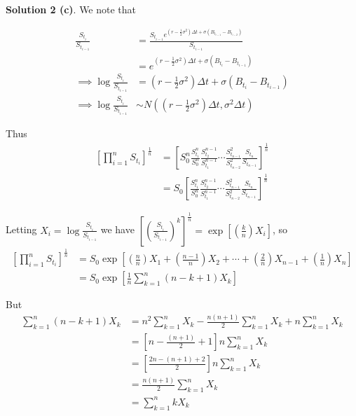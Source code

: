 \documentclass[12pt]{article}
\begin{document}
{\bf Solution 2 (c)}. We note that

\begin{align*}
	\frac{S_{t_i}}{S_{t_{i - 1}}} &= \frac{S_{t_{i - 1}} e^{ (r - \frac{1}{2}\sigma^2)\Delta t + \sigma (B_{t_{i - 1}} - B_{t_{i - 2}}) } }{ S_{t_{i - 1}} } \\
	&= e^{ (r - \frac{1}{2}\sigma^2) \Delta t +  \sigma (B_{t_i} - B_{t_{i - 1}}) } \\
	\implies \log \frac{S_{t_i}}{S_{t_{i - 1}}} &= \left(r - \frac{1}{2}\sigma^2\right)\Delta t + \sigma \left( B_{t_i}  - B_{t_{i - 1}} \right) \\
	\implies \log \frac{S_{t_i}}{S_{t_{i - 1}}} &\sim N\left( \left(r - \frac{1}{2}\sigma^2\right)\Delta t, \sigma^2\Delta t \right)
\end{align*}

Thus
\begin{align*}
\left[ \prod^n_{i=1} S_{t_i} \right]^{\frac{1}{n}} &= \left[S_0^{n} \frac{S_{t_1}^n}{S_0^n} \frac{S_{t_2}^{n - 1}}{S_{t_1}^{n - 1}} \cdots \frac{S_{t_{n - 1}}^{2}}{S_{t_{n - 2}}^2} \frac{S_{t_n}}{S_{t_{n - 1}}} \right]^\frac{1}{n} \\
	&= S_0 \left[ \frac{S_{t_1}^n}{S_0^n} \frac{S_{t_2}^{n - 1}}{S_{t_1}^{n - 1}} \cdots \frac{S_{t_{n - 1}}^{2}}{S_{t_{n - 2}}^2} \frac{S_{t_n}}{S_{t_{n - 1}}} \right]^\frac{1}{n}
\end{align*}

Letting $ X_i = \log \frac{S_{t_i}}{S_{t_{i - 1}}}$ we have $\left[ \left( \frac{S_{t_i}}{S_{t_{i - 1}}}\right)^k \right]^\frac{1}{n} = \exp \left[ \left(\frac{k}{n}\right) X_i \right]$, so
\begin{align*}
	\left[ \prod^n_{i=1} S_{t_i} \right]^{\frac{1}{n}} &= S_0 \exp\left[\left(\frac{n}{n}\right) X_1 + \left(\frac{n - 1}{n}\right) X_2 + \cdots + \left(\frac{2}{n}\right) X_{n - 1} + \left(\frac{1}{n}\right) X_n  \right] \\
	&= S_0 \exp\left[ 	\frac{1}{n} \sum^n_{k = 1} (n - k + 1)X_k  \right]
\end{align*}

But
\begin{align*}
	\sum^n_{k = 1} (n - k + 1)X_k &= n^2\sum^n_{k=1}X_k - \frac{n(n + 1)}{2}\sum^n_{k=1}X_k + n\sum^n_{k=1}X_k \\
	&= \left[n - \frac{(n + 1)}{2}+ 1 \right]n\sum^n_{k=1}X_k \\
	&= \left[ \frac{2n - (n + 1) + 2}{2} \right] n\sum^n_{k=1}X_k \\
	&= \frac{n(n + 1)}{2}\sum^n_{k=1}X_k \\
	&= \sum^n_{k = 1} kX_k
\end{align*}
\end{document}
